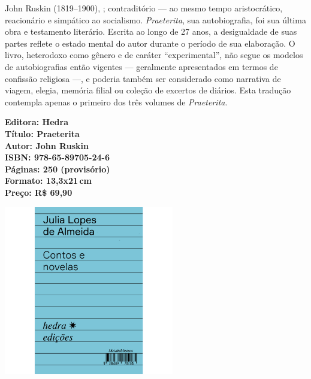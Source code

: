 \hspace*{-7cm}\hrulefill\hspace*{-7cm}

\medskip

\noindent{}John Ruskin (1819--1900), ; contraditório --- ao mesmo tempo aristocrático, reacionário e simpático ao socialismo. \textit{Praeterita}, sua autobiografia, foi sua última obra e testamento literário. Escrita ao longo de 27 anos, a desigualdade de suas partes reflete o estado mental do autor durante o período de sua elaboração. O livro, heterodoxo como gênero e de caráter ``experimental'', não segue os modelos de autobiografias então vigentes --- geralmente apresentados em termos de confissão religiosa ---, e poderia também ser considerado como narrativa de viagem, elegia, memória filial ou coleção de excertos de diários. Esta tradução contempla apenas o primeiro dos três volumes de \textit{Praeterita}.

\vfill

\noindent\begin{minipage}[c]{1\linewidth}
{\small\textbf{
\hspace*{-.1cm}Editora: Hedra\\
Título: Praeterita\\
Autor: John Ruskin\\ 
ISBN: 978-65-89705-24-6\\
Páginas: 250 (provisório)\\
Formato: 13,3x21\,cm\\
Preço: R\$ 69,90\\
}}
\end{minipage}

\pagebreak

\begin{center}
\hspace*{.5cm}\includegraphics[width=74mm]{./CAPAS/almeida.jpg}
\end{center}


